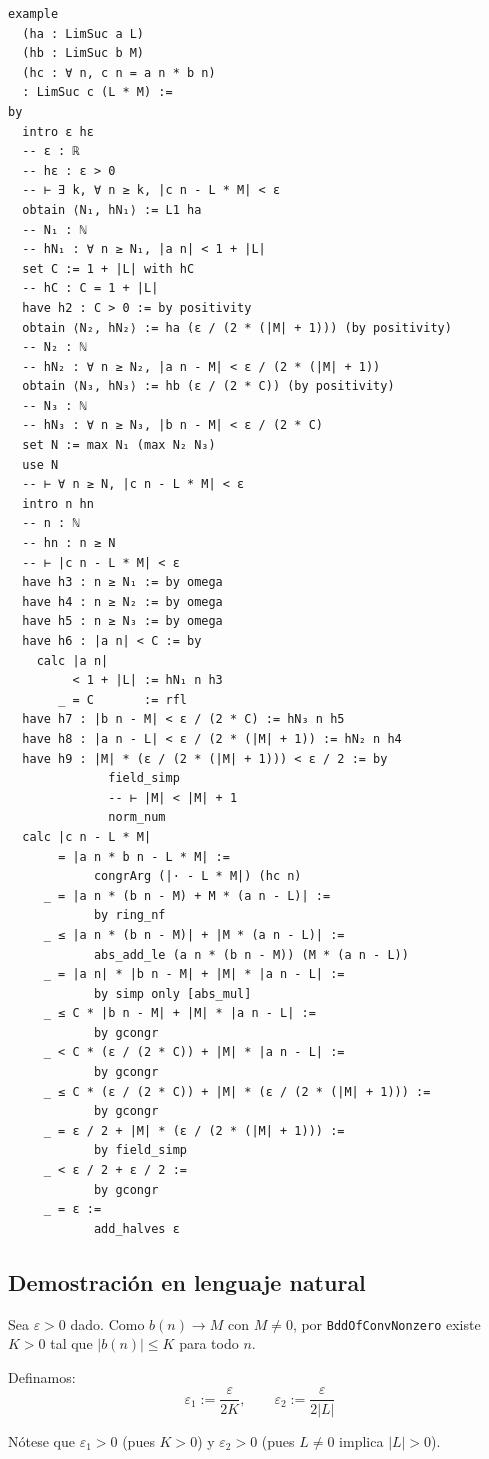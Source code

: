 \begin{verbatim}
example
  (ha : LimSuc a L)
  (hb : LimSuc b M)
  (hc : ∀ n, c n = a n * b n)
  : LimSuc c (L * M) :=
by
  intro ε hε
  -- ε : ℝ
  -- hε : ε > 0
  -- ⊢ ∃ k, ∀ n ≥ k, |c n - L * M| < ε
  obtain ⟨N₁, hN₁⟩ := L1 ha
  -- N₁ : ℕ
  -- hN₁ : ∀ n ≥ N₁, |a n| < 1 + |L|
  set C := 1 + |L| with hC
  -- hC : C = 1 + |L|
  have h2 : C > 0 := by positivity
  obtain ⟨N₂, hN₂⟩ := ha (ε / (2 * (|M| + 1))) (by positivity)
  -- N₂ : ℕ
  -- hN₂ : ∀ n ≥ N₂, |a n - M| < ε / (2 * (|M| + 1))
  obtain ⟨N₃, hN₃⟩ := hb (ε / (2 * C)) (by positivity)
  -- N₃ : ℕ
  -- hN₃ : ∀ n ≥ N₃, |b n - M| < ε / (2 * C)
  set N := max N₁ (max N₂ N₃)
  use N
  -- ⊢ ∀ n ≥ N, |c n - L * M| < ε
  intro n hn
  -- n : ℕ
  -- hn : n ≥ N
  -- ⊢ |c n - L * M| < ε
  have h3 : n ≥ N₁ := by omega
  have h4 : n ≥ N₂ := by omega
  have h5 : n ≥ N₃ := by omega
  have h6 : |a n| < C := by
    calc |a n|
         < 1 + |L| := hN₁ n h3
       _ = C       := rfl
  have h7 : |b n - M| < ε / (2 * C) := hN₃ n h5
  have h8 : |a n - L| < ε / (2 * (|M| + 1)) := hN₂ n h4
  have h9 : |M| * (ε / (2 * (|M| + 1))) < ε / 2 := by
              field_simp
              -- ⊢ |M| < |M| + 1
              norm_num
  calc |c n - L * M|
       = |a n * b n - L * M| :=
            congrArg (|· - L * M|) (hc n)
     _ = |a n * (b n - M) + M * (a n - L)| :=
            by ring_nf
     _ ≤ |a n * (b n - M)| + |M * (a n - L)| :=
            abs_add_le (a n * (b n - M)) (M * (a n - L))
     _ = |a n| * |b n - M| + |M| * |a n - L| :=
            by simp only [abs_mul]
     _ ≤ C * |b n - M| + |M| * |a n - L| :=
            by gcongr
     _ < C * (ε / (2 * C)) + |M| * |a n - L| :=
            by gcongr
     _ ≤ C * (ε / (2 * C)) + |M| * (ε / (2 * (|M| + 1))) :=
            by gcongr
     _ = ε / 2 + |M| * (ε / (2 * (|M| + 1))) :=
            by field_simp
     _ < ε / 2 + ε / 2 :=
            by gcongr
     _ = ε :=
            add_halves ε
\end{verbatim}

\subsection{Demostración en lenguaje natural}

  Sea $\varepsilon > 0$ dado. Como $b(n) \to M$ con $M \neq 0$, por
  \texttt{BddOfConvNonzero} existe $K > 0$ tal que $|b(n)| \leq K$ para todo $n$.

  Definamos:
  \[
    \varepsilon_1 := \frac{\varepsilon}{2K}, \qquad
    \varepsilon_2 := \frac{\varepsilon}{2|L|}
  \]

  Nótese que $\varepsilon_1 > 0$ (pues $K > 0$) y $\varepsilon_2 > 0$
  (pues $L \neq 0$ implica $|L| > 0$).

